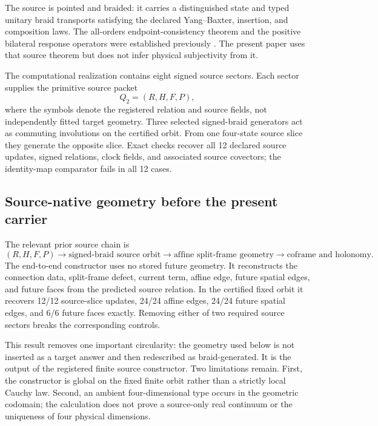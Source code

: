 \documentclass[11pt]{article}
\theoremstyle{definition}
\theoremstyle{remark}
\begin{document}
The source is pointed and braided: it carries a distinguished state and typed unitary braid transports satisfying the declared Yang--Baxter, insertion, and composition laws. The all-orders endpoint-consistency theorem and the positive bilateral response operators were established previously \cite{watanabe2026braid}. The present paper uses that source theorem but does not infer physical subjectivity from it.

The computational realization contains eight signed source sectors. Each sector supplies the primitive source packet
\begin{equation}\label{eq:sourcepacket}
 Q_2=(R,H,F,P),
\end{equation}
where the symbols denote the registered relation and source fields, not independently fitted target geometry. Three selected signed-braid generators act as commuting involutions on the certified orbit. From one four-state source slice they generate the opposite slice. Exact checks recover all 12 declared source updates, signed relations, clock fields, and associated source covectors; the identity-map comparator fails in all 12 cases.

\subsection{Source-native geometry before the present carrier}

The relevant prior source chain is
\begin{equation}\label{eq:sourcechain}
 (R,H,F,P)
 \longrightarrow \text{signed-braid source orbit}
 \longrightarrow \text{affine split-frame geometry}
 \longrightarrow \text{coframe and holonomy}.
\end{equation}
The end-to-end constructor uses no stored future geometry. It reconstructs the connection data, split-frame defect, current term, affine edge, future spatial edges, and future faces from the predicted source relation. In the certified fixed orbit it recovers 12/12 source-slice updates, 24/24 affine edges, 24/24 future spatial edges, and 6/6 future faces exactly. Removing either of two required source sectors breaks the corresponding controls.

This result removes one important circularity: the geometry used below is not inserted as a target answer and then redescribed as braid-generated. It is the output of the registered finite source constructor. Two limitations remain. First, the constructor is global on the fixed finite orbit rather than a strictly local Cauchy law. Second, an ambient four-dimensional type occurs in the geometric codomain; the calculation does not prove a source-only real continuum or the uniqueness of four physical dimensions.
\end{document}
